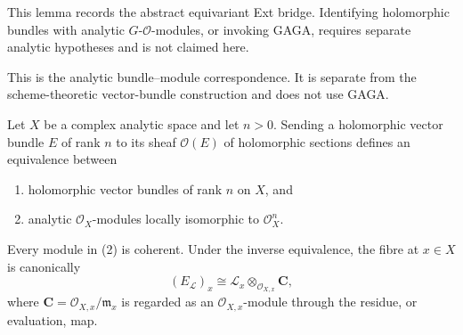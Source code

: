 \begin{remark}
This lemma records the abstract equivariant Ext bridge. Identifying
holomorphic bundles with analytic $G$-$\mathcal O$-modules, or invoking
GAGA, requires separate analytic hypotheses and is not claimed here.
\label{remark-equivariant-extension-classes-analytic-boundary}
\end{remark}

\begin{lemma}
\label{lemma-holomorphic-vector-bundles-locally-free-analytic-modules}
\begin{reference}
\cite[Chapter V, \S 5.6, p. 219]{Tohoku}
\end{reference}
\begin{history}
This is the analytic bundle--module correspondence. It is separate from
the scheme-theoretic vector-bundle construction and does not use GAGA.
\end{history}
Let $X$ be a complex analytic space and let $n>0$. Sending a holomorphic
vector bundle $E$ of rank $n$ to its sheaf $\mathcal O(E)$ of holomorphic
sections defines an equivalence between
\begin{enumerate}
\item holomorphic vector bundles of rank $n$ on $X$, and
\item analytic $\mathcal O_X$-modules locally isomorphic to
$\mathcal O_X^n$.
\end{enumerate}
Every module in (2) is coherent. Under the inverse equivalence, the fibre
at $x\in X$ is canonically
$$
(E_{\mathcal L})_x
\cong
\mathcal L_x\otimes_{\mathcal O_{X,x}}\mathbf C,
$$
where $\mathbf C=\mathcal O_{X,x}/\mathfrak m_x$ is regarded as an
$\mathcal O_{X,x}$-module through the residue, or evaluation, map.
\end{lemma}

